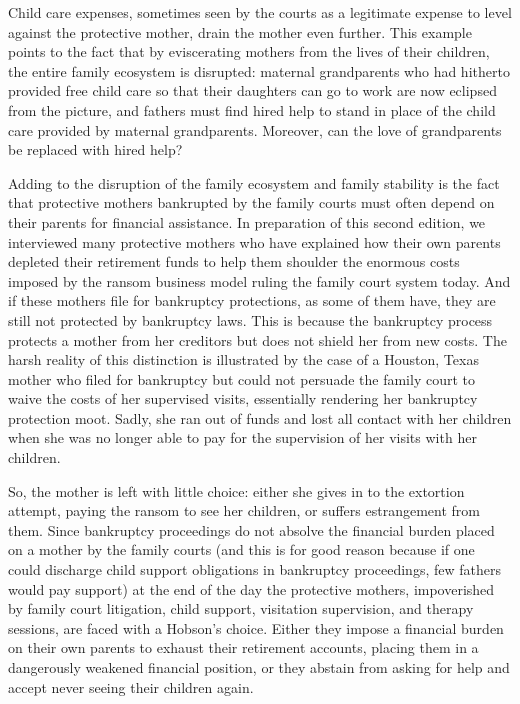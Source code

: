 \vspace{-1.1em}
Child care expenses, sometimes seen by the courts 
as a legitimate expense to level against the protective mother, drain the mother even
further. This example points to the fact that by eviscerating mothers
from the lives of their children, the entire family ecosystem is disrupted:
maternal grandparents who had hitherto provided free child care so that
their daughters can go to work are now eclipsed from the picture, and
fathers must find hired help to stand in place of the child care provided
by maternal grandparents. Moreover, can the love of grandparents
be replaced with hired help? \pfl{}

Adding to the disruption of the family ecosystem and family stability
is the fact that protective mothers bankrupted by the family courts must
often depend on their parents for financial assistance. In preparation
of this second edition, we interviewed many protective mothers who
have explained how their own parents depleted their retirement funds
to help them shoulder the enormous costs imposed by the ransom 
business model ruling the family court system today. And if these mothers
file for bankruptcy protections, as some of them have, they are still not
protected by bankruptcy laws. This is because the bankruptcy process
protects a mother from her creditors but does not shield her from new
costs. The harsh reality of this distinction is illustrated by the case of a
Houston, Texas mother who filed for bankruptcy but could not persuade
the family court to waive the costs of her supervised visits, essentially
rendering her bankruptcy protection moot. Sadly, she ran out of funds
and lost all contact with her children when she was no longer able to pay
for the supervision of her visits with her children. \pfl{}

So, the mother is left with little choice: either she gives in to the
extortion attempt, paying the ransom to see her children, 
or suffers estrangement from them. Since bankruptcy proceedings do not absolve
the financial burden placed on a mother by the family courts (and this is
for good reason because if one could discharge child support obligations
in bankruptcy proceedings, few fathers would pay support) at the
end of the day the protective mothers, impoverished by family court 
litigation, child support, visitation supervision, and therapy sessions, are
faced with a Hobson's choice. Either they impose a financial burden on
their own parents to exhaust their retirement accounts, placing them in
a dangerously weakened financial position, or they abstain from asking
for help and accept never seeing their children again. \pfl{}

